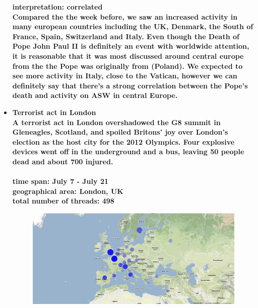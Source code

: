 \documentclass[11pt,a4paper,english]{article}
\begin{document}
\begin{itemize}
					\bf interpretation: \rm correlated
					\\ Compared the the week before, we saw an increased activity in many european countries including the UK, Denmark, the South of France, Spain, Switzerland and Italy. Even though the Death of Pope John Paul II is definitely an event with worldwide attention, it is reasonable that it was most discussed around central europe from the the Pope was originally from (Poland). We expected to see more activity in Italy, close to the Vatican, however we can definitely say that there's a strong correlation between the Pope's death and activity on ASW in central Europe.
						


				\item \bf Terrorist act in London \rm
					\\ A terrorist act in London overshadowed the G8 summit in Gleneagles, Scotland, and spoiled Britons' joy over London's election as the host city for the 2012 Olympics. Four explosive devices went off in the underground and a bus, leaving 50 people dead and about 700 injured.
					\\\\ \bf time span: \rm July 7 - July 21
					\\ \bf geographical area: \rm London, UK
					\\ \bf total number of threads: \rm 498
					\begin{figure}[H]
						\vspace{-5pt}
						\begin{center}
							\includegraphics[width=130mm]{img/pre-london}
						\end{center}
						\vspace{-13pt}
					\end{figure}
					\begin{figure}[H]
						\vspace{-10pt}
  						\begin{center}

\end{center}
\end{figure}
\end{itemize}
\end{document}
